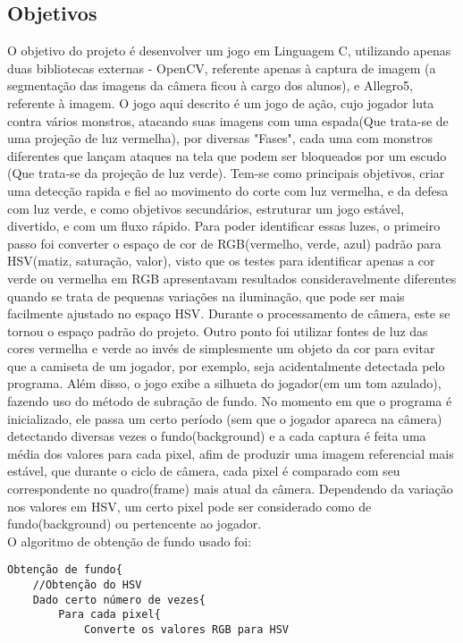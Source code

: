 \documentclass[12pt]{sciposter}
\begin{document}
\begin{multicols}{3}
\section{Objetivos}
O objetivo do projeto é desenvolver um jogo em Linguagem C, utilizando apenas duas bibliotecas externas - OpenCV, referente apenas à captura de imagem (a segmentação das imagens da câmera ficou à cargo dos alunos), e Allegro5, referente à imagem.
O jogo aqui descrito é um jogo de ação, cujo jogador luta contra vários monstros, atacando suas imagens com uma espada(Que trata-se de uma projeção de luz vermelha), por diversas "Fases", cada uma com monstros diferentes que lançam ataques na tela que podem ser bloqueados por um escudo (Que trata-se da projeção de luz verde).
Tem-se como principais objetivos, criar uma detecção rapida e fiel ao movimento do corte com luz vermelha, e da defesa com luz verde, e como objetivos secundários, estruturar um jogo estável, divertido, e com um fluxo rápido.
Para poder identificar essas luzes, o primeiro passo foi converter o espaço de cor de RGB(vermelho, verde, azul) padrão para HSV(matiz, saturação, valor), visto que os testes para identificar apenas a cor verde ou vermelha em RGB apresentavam resultados consideravelmente diferentes quando se trata de pequenas variações na iluminação, que pode ser mais facilmente ajustado no espaço HSV. Durante o processamento de câmera, este se tornou o espaço padrão do projeto. Outro ponto foi utilizar fontes de luz das cores vermelha e verde ao invés de simplesmente um objeto da cor para evitar que a camiseta de um jogador, por exemplo, seja acidentalmente detectada pelo programa.
Além disso, o jogo exibe a silhueta do jogador(em um tom azulado), fazendo uso do método de subração de fundo. No momento em que o programa é inicializado, ele passa um certo período (sem que o jogador apareca na câmera) detectando diversas vezes o fundo(background) e a cada captura é feita uma média dos valores para cada pixel, afim de produzir uma imagem referencial mais estável, que durante o ciclo de câmera, cada pixel é comparado com seu correspondente no quadro(frame) mais atual da câmera. Dependendo da variação nos valores em HSV, um certo pixel pode ser considerado como de fundo(background) ou pertencente ao jogador.\\
O algoritmo de obtenção de fundo usado foi:

\begin {lstlisting}
Obtenção de fundo{
    //Obtenção do HSV
    Dado certo número de vezes{
        Para cada pixel{
            Converte os valores RGB para HSV
            

\end{lstlisting}
\end{multicols}
\end{document}
